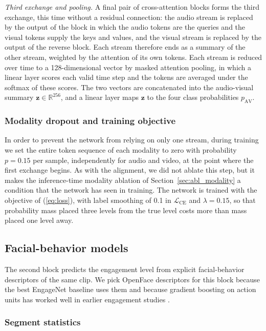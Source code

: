 \documentclass[pdflatex,iicol,sn-basic]{sn-jnl}
\begin{document}
\emph{Third exchange and pooling.} A final pair of cross-attention blocks forms the third exchange, this time without a residual connection: the audio stream is replaced by the output of the block in which the audio tokens are the queries and the visual tokens supply the keys and values, and the visual stream is replaced by the output of the reverse block. Each stream therefore ends as a summary of the other stream, weighted by the attention of its own tokens. Each stream is reduced over time to a 128-dimensional vector by masked attention pooling, in which a linear layer scores each valid time step and the tokens are averaged under the softmax of these scores. The two vectors are concatenated into the audio-visual summary $\mathbf{z} \in \mathbb{R}^{256}$, and a linear layer maps $\mathbf{z}$ to the four class probabilities $p_{\mathrm{AV}}$.

\subsubsection{Modality dropout and training objective}\label{sec:dropout}

In order to prevent the network from relying on only one stream, during training we set the entire token sequence of each modality to zero with probability $p = 0.15$ per sample, independently for audio and video, at the point where the first exchange begins. As with the alignment, we did not ablate this step, but it makes the inference-time modality ablation of Section~\ref{sec:abl_modality} a condition that the network has seen in training. The network is trained with the objective of (\ref{eq:loss}), with label smoothing of 0.1 in $\mathcal{L}_{\mathrm{CE}}$ and $\lambda = 0.15$, so that probability mass placed three levels from the true level costs more than mass placed one level away.

\subsection{Facial-behavior models}\label{sec:method_beh}

The second block predicts the engagement level from explicit facial-behavior descriptors of the same clip. We pick OpenFace descriptors for this block because the best EngageNet baseline uses them \citep{singh2023engagenet} and because gradient boosting on action units has worked well in earlier engagement studies \citep{das2025optimizing,wang2026shap}.

\subsubsection{Segment statistics}\label{sec:segstats}
\end{document}
